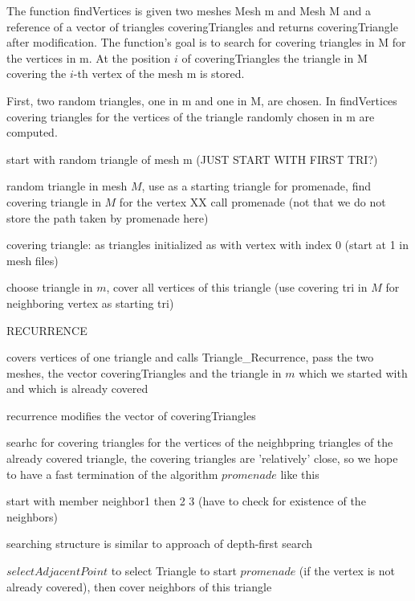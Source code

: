\documentclass[10pt]{article}
\begin{document}
The function {\ttfamily findVertices} is given two meshes {\ttfamily Mesh m} and {\ttfamily Mesh M} and a reference of a vector of triangles {\ttfamily coveringTriangles} and returns {\ttfamily coveringTriangle} after modification. The function's goal is to search for covering triangles in {\ttfamily M} for the vertices in {\ttfamily  m}. At the position $i$ of {\ttfamily coveringTriangles} the triangle in {\ttfamily M} covering the $i$-th vertex of the mesh {\ttfamily m} is stored.

First, two random triangles, one in {\ttfamily m} and one in {\ttfamily M}, are chosen. In {\ttfamily findVertices} covering triangles for the vertices of the triangle randomly chosen in {\ttfamily m} are computed.

start with random triangle of mesh m (JUST START WITH FIRST TRI?)

random triangle in mesh $M$, use as a starting triangle for {\ttfamily promenade}, find covering triangle in $M$ for the vertex XX
call promenade (not that we do not store the path taken by promenade here)

covering triangle: as triangles initialized as with vertex with index 0 (start at 1 in mesh files)

choose triangle in $m$, cover all vertices of this triangle (use covering tri in $M$ for neighboring vertex as starting tri)

RECURRENCE

covers vertices of one triangle and calls {\ttfamily Triangle\_Recurrence}, pass the two meshes, the vector {\ttfamily coveringTriangles} and the triangle in $m$ which we started with and which is already covered

recurrence modifies the vector of coveringTriangles

searhc for covering triangles for the vertices of the neighbpring triangles of the already covered triangle, the covering triangles are 'relatively' close, so we hope to have a fast termination of the algorithm $promenade$ like this

start with member neighbor1 then 2 3 (have to check for existence of the neighbors)

searching structure is similar to approach of depth-first search

$selectAdjacentPoint$ to select Triangle to start $promenade$ (if the vertex is not already covered), then cover neighbors of this triangle
\end{document}

